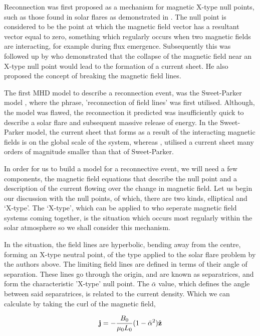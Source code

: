 Reconnection was first proposed as a mechanism for magnetic X-type null points, such as those found in solar flares as demonstrated in  \cite{Giovanelli1946}.
The null point is considered to be the point at which the magnetic field vector has a resultant vector equal to zero, something which regularly occurs when two magnetic fields are interacting, for example during flux emergence.
Subsequently this was followed up by \cite{Dungey1953} who demonstrated that the collapse of the magnetic field near an X-type null point would lead to the formation of a current sheet.
He also proposed the concept of breaking the magnetic field lines.

The first MHD model to describe a reconnection event, was the Sweet-Parker model \citep{Sweet1958, Parker1957}, where the phrase, 'reconnection of field lines' was first utilised.
Although, the model was flawed, the reconnection it predicted was insufficiently quick to describe a solar flare and subsequent massive release of energy.
In the Sweet-Parker model, the current sheet that forms as a result of the interacting magnetic fields is on the global scale of the system, whereas \cite{Petschek1964}, utilised a current sheet many orders of magnitude smaller than that of Sweet-Parker.

In order for us to build a model for a reconnective event, we will need a few components, the magnetic field equations that describe the null point and a description of the current flowing over the change in magnetic field.
Let us begin our discussion with the null points, of which, there are two kinds, elliptical and `X-type'.
The `X-type', which can be applied to who seperate magnetic field systems coming together, is the situation which occurs most regularly within the solar atmosphere so we shall consider this mechanism.

In the situation, the field lines are hyperbolic, bending away from the centre, forming an X-type neutral point, of the type applied to the solar flare problem by the authors above.
The limiting field lines are defined in terms of their angle of separation.
These lines go through the origin, and are known as separatrices, and form the characteristic 'X-type' null point. 
The $\bar{\alpha}$ value, which defines the angle between said separatrices, is related to the current density.
Which we can calculate by taking the curl of the magnetic field, \cite{Priest2007}

\begin{equation}
	\mathbf{j} = -\frac{B_0}{\mu_0L_0}(1 - \bar{\alpha}^2)\hat{\mathbf{z}}
\end{equation}

